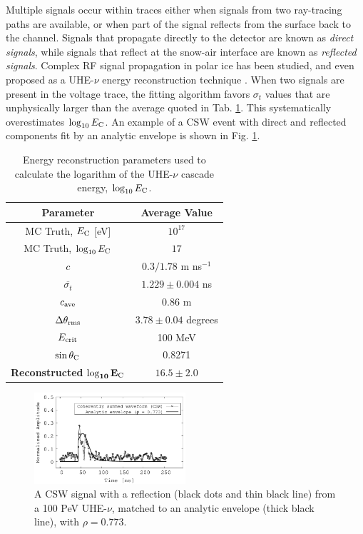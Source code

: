 \documentclass[amsmath,amssymb,aps,prd,10pt,twocolumn,showkeys]{revtex4}
\begin{document}
Multiple signals occur within traces either when signals from two ray-tracing paths are available, or when part of the signal reflects from the surface back to the channel.  Signals that propagate directly to the detector are known as \textit{direct signals}, while signals that reflect at the snow-air interface are known as \textit{reflected signals}.  Complex RF signal propagation in polar ice has been studied, and even proposed as a UHE-$\nu$ energy reconstruction technique \cite{Barwick:2018497,anker2019neutrino-734,deaconu2018measurements-182}.  When two signals are present in the voltage trace, the fitting algorithm favors $\sigma_t$ values that are unphysically larger than the average quoted in Tab. \ref{tab:2}.  This systematically overestimates $\log_{10} E_{\rm C}$.  An example of a CSW event with direct and reflected components fit by an analytic envelope is shown in Fig. \ref{fig:example_waveforms_2}.

\begin{table}[hb]
\centering
\begin{tabular}{| c | c |}
\hline
\textbf{Parameter} & \textbf{Average Value} \\ \hline
MC Truth, $E_{\rm C}$ [eV] & $10^{17}$ \\
MC Truth, $\log_{10}E_{\rm C}$ & $17$ \\
$c$ & $0.3/1.78$ m ns$^{-1}$ \\
$\overline{\sigma_t}$ & $1.229 \pm 0.004$ ns \\
$c_{\rm ave}$ & 0.86 m \\
$\Delta\theta_{\rm rms}$ & $3.78\pm0.04$ degrees \\
$E_{\rm crit}$ & 100 MeV \\
$\sin\theta_{\rm C}$ & 0.8271 \\ \hline
\textbf{Reconstructed} $\mathbf{\log_{10}E_{\rm C}}$ & $16.5\pm 2.0$ \\
\hline
\end{tabular}
\caption{\label{tab:2} Energy reconstruction parameters used to calculate the logarithm of the UHE-$\nu$ cascade energy, $\log_{10}E_{\rm C}$.}
\end{table}

\begin{figure}
\centering
\includegraphics[width=0.5\textwidth]{Sept25_plot2.pdf}
\caption{\label{fig:example_waveforms_2} A CSW signal with a reflection (black dots and thin black line) from a 100 PeV UHE-$\nu$, matched to an analytic envelope (thick black line), with $\rho = 0.773$.}
\end{figure}
\end{document}
